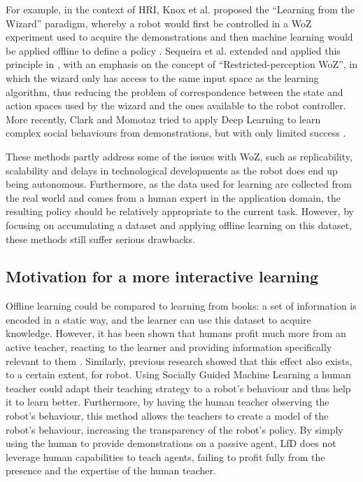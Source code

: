 \documentclass[manuscript, review, anonymous]{acmart}
\begin{document}
For example, in the context of HRI, Knox et al. proposed the ``Learning from the
Wizard'' paradigm, whereby a robot would first be controlled in a WoZ experiment
used to acquire the demonstrations and then machine learning would be applied
offline to define a policy \cite{knox2014learning}. Sequeira et al. extended and
applied this principle in \cite{sequeira2016discovering}, with an emphasis on
the concept of ``Restricted-perception WoZ'', in which the wizard only has access to the
same input space as the learning algorithm, thus reducing the problem of
correspondence between the state and action spaces used by the wizard and the
ones available to the robot controller. More recently, Clark and Momotaz tried
to apply Deep Learning to learn complex social behaviours from demonstrations,
but with only limited success \cite{clark2018deep}.

These methods partly address some of the issues with WoZ, such as replicability,
scalability and delays in technological developments as the robot does end up
being autonomous. Furthermore, as the data used for learning are collected from
the real world and comes from a human expert in the application domain, the
resulting policy should be relatively appropriate to the current task. However,
by focusing on accumulating a dataset and applying offline learning on this 
dataset, these methods still suffer serious drawbacks.

\subsection{Motivation for a more interactive learning}

Offline learning could be compared to learning from books: a set
of information is encoded in a static way, and the learner can use this dataset to acquire
knowledge. However, it has been shown that humans profit
much more from an active teacher, reacting to the learner and providing 
information specifically relevant to them \cite{bloom19842}. Similarly,
previous research showed that this effect also exists, to a certain extent, 
for robot. Using Socially Guided Machine Learning \cite{thomaz2008teachable} 
a human teacher could adapt their
teaching strategy to a robot's behaviour and thus help it to learn better. Furthermore, by having the human teacher observing
the robot's behaviour, this method allows the teachers to create a model of the robot's behaviour, increasing the transparency of the robot's policy. 
By simply using the human to provide demonstrations
on a passive agent, LfD does not leverage human
capabilities to teach agents, failing to profit fully from the presence and the expertise of the 
human teacher.
\end{document}
